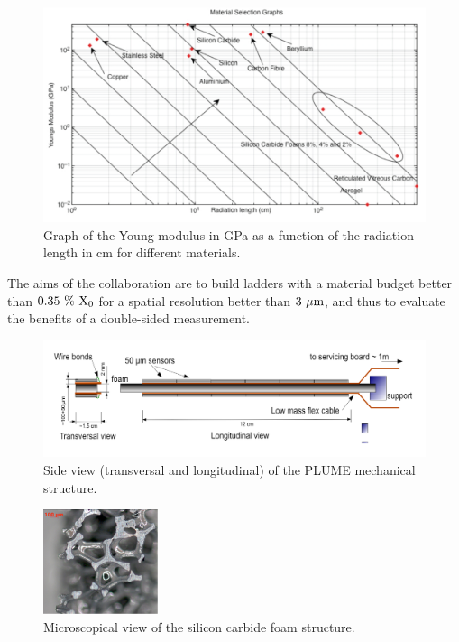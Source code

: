     \begin{figure}[!h]
      \centering
      \includegraphics[width = \textwidth]{Pictures/vxd/youngModulus_vs_radiationLength-004.jpg}
      \caption{Graph of the Young modulus in GPa as a function of the radiation length in cm for different materials.}
      \label{fig:YoungModulus}
    \end{figure}

    The aims of the collaboration are to build ladders with a material budget better than $0.35~\%~\rm{X_0}$ for a spatial resolution better than $3~\rm{\mu m}$, and thus to evaluate the benefits of a double-sided measurement.

    \begin{figure}[!h]
      \centering
      \includegraphics[width = 15 cm]{Pictures/vxd/plume_finalGoal.png}
      \caption{Side view (transversal and longitudinal) of the PLUME mechanical structure.}
      \label{fig:PLUME}
    \end{figure}

    \begin{figure}[!h]
      \centering
      \includegraphics[width=0.3\textwidth]{Pictures/vxd/foam2.png}
      \caption{Microscopical view of the silicon carbide foam structure.}
      \label{fig:SiC}
    \end{figure}

